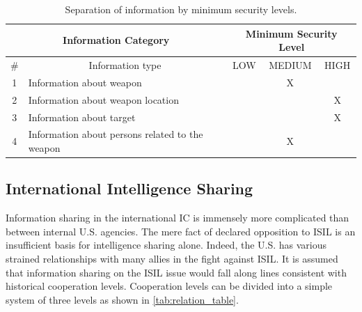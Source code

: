 \documentclass{report}
\begin{document}
\begin{table}
\centering
\begin{tabular}{|c|l|c|c|c|}
\hline
\multicolumn{2}{|c|}{Information Category}           & \multicolumn{3}{c|}{Minimum Security Level}                                                 \\ \hline
\# & \multicolumn{1}{c|}{Information type}           & \cellcolor[HTML]{34FF34}LOW & \cellcolor[HTML]{FCFF2F}MEDIUM & \cellcolor[HTML]{FE0000}HIGH \\ \hline
1  & Information about weapon                        & \cellcolor[HTML]{34FF34}    & \cellcolor[HTML]{FCFF2F}X      & \cellcolor[HTML]{FE0000}     \\ \hline
2  & Information about weapon location               & \cellcolor[HTML]{34FF34}    & \cellcolor[HTML]{FCFF2F}       & \cellcolor[HTML]{FE0000}X    \\ \hline
3  & Information about target                        & \cellcolor[HTML]{34FF34}    & \cellcolor[HTML]{FCFF2F}       & \cellcolor[HTML]{FE0000}X    \\ \hline
4  & Information about persons related to the weapon & \cellcolor[HTML]{34FF34}    & \cellcolor[HTML]{FCFF2F}X      & \cellcolor[HTML]{FE0000}     \\ \hline
\end{tabular}
\caption{Separation of information by minimum security levels.}
\label{tab:separate_sec_level}
\end{table}

\subsection{International Intelligence Sharing}

Information sharing in the international IC is immensely more complicated than between internal U.S. agencies. The mere fact of declared opposition to ISIL is an insufficient basis for intelligence sharing alone.  Indeed, the U.S. has  various strained relationships with many allies in the fight against ISIL. It is assumed that information sharing on the ISIL issue would fall along lines consistent with historical cooperation levels. Cooperation levels can be divided into a simple system of three levels as shown in \autoref{tab:relation_table}.
\end{document}

